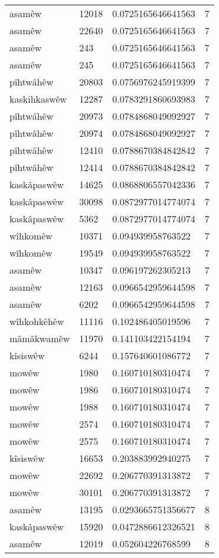 \begin{longtable}{llll}
asamêw & 12018 & 0.0725165646641563 & 7\\
asamêw & 22640 & 0.0725165646641563 & 7\\
asamêw & 243 & 0.0725165646641563 & 7\\
asamêw & 245 & 0.0725165646641563 & 7\\
pîhtwâhêw & 20803 & 0.0756976245919399 & 7\\
kaskihkaswêw & 12287 & 0.0783291860693983 & 7\\
pîhtwâhêw & 20973 & 0.0784868049092927 & 7\\
pîhtwâhêw & 20974 & 0.0784868049092927 & 7\\
pîhtwâhêw & 12410 & 0.0788670384842842 & 7\\
pîhtwâhêw & 12414 & 0.0788670384842842 & 7\\
kaskâpaswêw & 14625 & 0.0868806557042336 & 7\\
kaskâpaswêw & 30098 & 0.0872977014774074 & 7\\
kaskâpaswêw & 5362 & 0.0872977014774074 & 7\\
wîhkomêw & 10371 & 0.094939958763522 & 7\\
wîhkomêw & 19549 & 0.094939958763522 & 7\\
asamêw & 10347 & 0.096197262305213 & 7\\
asamêw & 12163 & 0.0966542959644598 & 7\\
asamêw & 6202 & 0.0966542959644598 & 7\\
wîhkohkêhêw & 11116 & 0.102486405019596 & 7\\
mâmâkwamêw & 11970 & 0.141103422154194 & 7\\
kîsiswêw & 6244 & 0.157640601086772 & 7\\
mowêw & 1980 & 0.160710180310474 & 7\\
mowêw & 1986 & 0.160710180310474 & 7\\
mowêw & 1988 & 0.160710180310474 & 7\\
mowêw & 2574 & 0.160710180310474 & 7\\
mowêw & 2575 & 0.160710180310474 & 7\\
kîsiswêw & 16653 & 0.203883992940275 & 7\\
mowêw & 22692 & 0.206770391313872 & 7\\
mowêw & 30101 & 0.206770391313872 & 7\\
asamêw & 13195 & 0.0293665751356677 & 8\\
kaskâpaswêw & 15920 & 0.0472886612326521 & 8\\
asamêw & 12019 & 0.052604226768599 & 8\\

\end{longtable}
